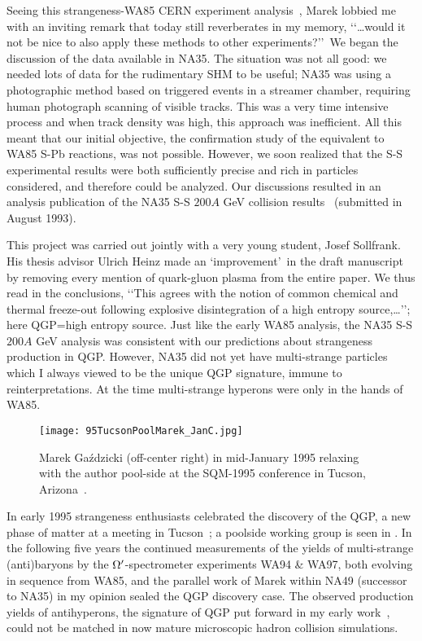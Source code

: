 \documentclass{appolb}
\begin{document}
Seeing this strangeness-WA85 CERN experiment analysis~\cite{Rafelski:1991rh}, Marek lobbied me with an inviting remark that today still reverberates in my memory, \lq\lq \ldots would it not be nice to also apply these methods to other experiments?\rq\rq\ We began the discussion of the data available in NA35. The situation was not all good: we needed lots of data for the rudimentary SHM to be useful; NA35 was using a photographic method based on triggered events in a streamer chamber, requiring human photograph scanning of visible tracks. This was a very time intensive process and when track density was high, this approach was inefficient. All this meant that our initial objective, the confirmation study of the equivalent to WA85 S-Pb reactions, was not possible. However, we soon realized that the S-S experimental results were both sufficiently precise and rich in particles considered, and therefore could be analyzed. Our discussions resulted in an analysis publication of the NA35 S-S $200 A$ GeV collision results~\cite{Sollfrank:1993wn} (submitted in August 1993).

This project was carried out jointly with a very young student, Josef Sollfrank. His thesis advisor Ulrich Heinz made an \lq improvement\rq\ in the draft manuscript by removing every mention of quark-gluon plasma from the entire paper. We thus read in the conclusions, \lq\lq This agrees with the notion of common chemical and thermal freeze-out following explosive disintegration of a high entropy source,\ldots\rq\rq; here QGP=high entropy source. Just like the early WA85 analysis, the NA35 S-S $200 A$ GeV analysis was consistent with our predictions about strangeness production in QGP. However, NA35 did not yet have multi-strange particles which I always viewed to be the unique QGP signature, immune to reinterpretations. At the time multi-strange hyperons were only in the hands of WA85. 


\begin{figure}[bht]
\centerline{%
\texttt{[image: 95TucsonPoolMarek\_JanC.jpg]}}
\caption{Marek Ga\'zdzicki (off-center right) in mid-January 1995 relaxing with the author pool-side at the SQM-1995 conference in Tucson, Arizona~\cite{Rafelski:1995zq}.}
\label{MG_SQM}
\end{figure}

In early 1995 strangeness enthusiasts celebrated the discovery of the QGP, a new phase of matter at a meeting in Tucson~\cite{Rafelski:1995zq}; a poolside working group is seen in . In the following five years the continued measurements of the yields of multi-strange (anti)baryons by the $\Omega\rq$-spectrometer experiments WA94 \& WA97, both evolving in sequence from WA85, and the parallel work of Marek within NA49 (successor to NA35) in my opinion sealed the QGP discovery case. The observed production yields of antihyperons, the signature of QGP put forward in my early work~\cite{Rafelski:1980fy,Rafelski:1982ii}, could not be matched in now mature microscopic hadron collision simulations. 
\end{document}
